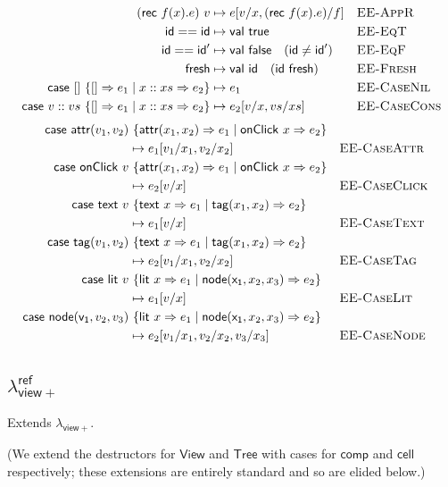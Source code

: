 \documentclass{article}
\newcommand{\mf}[1]{\mathsf{#1}}
\newcommand{\tview}{\mf{View}}
\newcommand{\ttree}{\mf{Tree}}
\newcommand{\vtxt}[1]{\mf{text}\ #1}
\newcommand{\vtag}[2]{\mf{tag}(#1, #2)}
\newcommand{\vattr}[2]{\mf{attr}(#1, #2)}
\newcommand{\vclick}[1]{\mf{onClick}\ #1}
\newcommand{\ecase}[5]{\mf{case}\ #1\ \{#2 \Rightarrow #3 \mid #4 \Rightarrow #5\}}
\newcommand{\elit}[1]{\mf{lit}\ #1}
\newcommand{\enode}[3]{\mf{node}(\mf{#1}, #2, #3)}
\begin{document}
\begin{align*}
(\mf{rec}\ f(x).e)\ v &\mapsto e[v/x, (\mf{rec}\ f(x).e)/f]
&&\textsc{EE-AppR}\\
\mf{id} == \mf{id} &\mapsto \mf{val}\ \mf{true} &&\textsc{EE-EqT}\\
\mf{id} == \mf{id}' &\mapsto \mf{val}\ \mf{false} \quad(\mf{id} \neq \mf{id}')
&&\textsc{EE-EqF}\\
\mf{fresh} &\mapsto \mf{val}\ \mf{id} \quad(\mf{id}\ \mf{fresh})
&&\textsc{EE-Fresh}\\
\ecase{[]}{[]}{e_1}{x :: xs}{e_2} &\mapsto e_1
&&\textsc{EE-CaseNil}\\
\ecase{v :: vs}{[]}{e_1}{x :: xs}{e_2} &\mapsto e_2[v/x, vs/xs]
&&\textsc{EE-CaseCons}\\
\end{align*}
\begin{align*}
\ecase{\vattr{v_1}{v_2}&}{\vattr{x_1}{x_2}}{e_1}{\vclick{x}}{e_2}\\ 
&\mapsto e_1[v_1/x_1, v_2/x_2]
&&\textsc{EE-CaseAttr}\\
\ecase{\vclick{v}&}{\vattr{x_1}{x_2}}{e_1}{\vclick{x}}{e_2}\\ 
&\mapsto e_2[v/x]
&&\textsc{EE-CaseClick}\\
\ecase{\vtxt{v}&}{\vtxt{x}}{e_1}{\vtag{x_1}{x_2}}{e_2}\\ 
&\mapsto e_1[v/x]
&&\textsc{EE-CaseText}\\
\ecase{\vtag{v_1}{v_2}&}{\vtxt{x}}{e_1}{\vtag{x_1}{x_2}}{e_2}\\ 
&\mapsto e_2[v_1/x_1,v_2/x_2]
&&\textsc{EE-CaseTag}\\
\ecase{\elit{v}&}{\elit{x}}{e_1}{\enode{x_1}{x_2}{x_3}}{e_2}\\ 
&\mapsto e_1[v/x]
&&\textsc{EE-CaseLit}\\
\ecase{\enode{v_1}{v_2}{v_3}&}{\elit{x}}{e_1}{\enode{x_1}{x_2}{x_3}}{e_2}\\ 
&\mapsto e_2[v_1/x_1,v_2/x_2,v_3/x_3]
&&\textsc{EE-CaseNode}\\
\end{align*}

\subsection{$\lambda^\mf{ref}_{\mf{view}+}$}

Extends $\lambda_{\mf{view}+}$.

(We extend the destructors for $\tview$ and $\ttree$
with cases for $\mf{comp}$ and $\mf{cell}$ respectively;
these extensions are entirely standard and so are elided below.)
\end{document}
